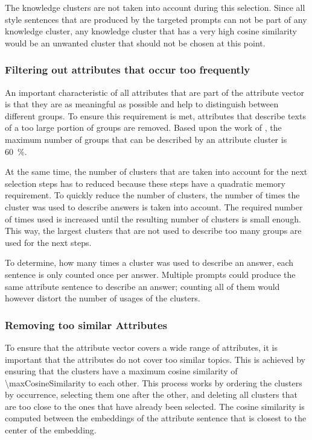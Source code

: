 The knowledge clusters are not taken into account during this selection. Since all style sentences that are produced by the targeted prompts can not be part of any knowledge cluster, any knowledge cluster that has a very high cosine similarity would be an unwanted cluster that should not be chosen at this point.


\subsubsection{Filtering out attributes that occur too frequently}
\label{sec:experiments:setup:selection:filteringOccurance}
An important characteristic of all attributes that are part of the attribute vector is that they are as meaningful as possible and help to distinguish between different groups. To ensure this requirement is met, attributes that describe texts of a too large portion of groups are removed. Based upon the work of \citet{patelLearningInterpretableStyle2023}, the maximum number of groups that can be described by an attribute cluster is \SI{60}{\percent}.

At the same time, the number of clusters that are taken into account for the next selection steps has to reduced because these steps have a quadratic memory requirement. To quickly reduce the number of clusters, the number of times the cluster was used to describe answers is taken into account. The required number of times used is increased until the resulting number of clusters is small enough. This way, the largest clusters that are not used to describe too many groups are used for the next steps.

To determine, how many times a cluster was used to describe an answer, each sentence is only counted once per answer. Multiple prompts could produce the same attribute sentence to describe an answer; counting all of them would however distort the number of usages of the clusters.

\subsubsection{Removing too similar Attributes}
\label{sec:experiments:setup:selection:removeSimilar}
To ensure that the attribute vector covers a wide range of attributes, it is important that the attributes do not cover too similar topics. This is achieved by ensuring that the clusters have a maximum cosine similarity of \num{\maxCosineSimilarity} to each other. This process works by ordering the clusters by occurrence, selecting them one after the other, and deleting all clusters that are too close to the ones that have already been selected.
The cosine similarity is computed between the embeddings of the attribute sentence that is closest to the center of the embedding.

